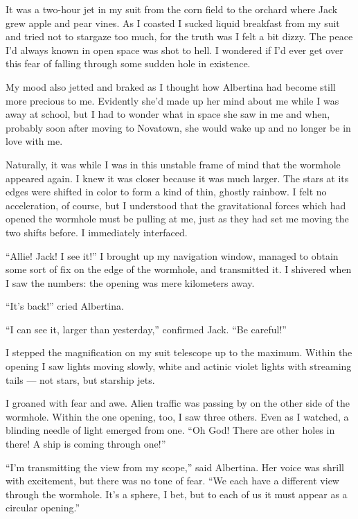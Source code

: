 \documentclass[english,11pt,letterpaper,onecolumn]{scrbook}
\begin{document}
	It was a two-hour jet in my suit from the corn field to the orchard where Jack grew apple and pear vines.  As I coasted I sucked liquid breakfast from my suit and tried not to stargaze too much, for the truth was I felt a bit dizzy.  The peace I'd always known in open space was shot to hell.  I wondered if I'd ever get over this fear of falling through some sudden hole in existence.  

	My mood also jetted and braked as I thought how Albertina had become still more precious to me.  Evidently she'd made up her mind about me while I was away at school, but I had to wonder what in space she saw in me and when, probably soon after moving to Novatown, she would wake up and no longer be in love with me.

	Naturally, it was while I was in this unstable frame of mind that the wormhole appeared again.  I knew it was closer because it was much larger.  The stars at its edges were shifted in color to form a kind of thin, ghostly rainbow.  I felt no acceleration, of course, but I understood that the gravitational forces which had opened the wormhole must be pulling at me, just as they had set me moving the two shifts before.  I immediately interfaced.

	``Allie!  Jack!  I see it!''  I brought up my navigation window, managed to obtain some sort of fix on the edge of the wormhole, and transmitted it.  I shivered when I saw the numbers:  the opening was mere kilometers away.

	``It's back!'' cried Albertina.

	``I can see it, larger than yesterday,'' confirmed Jack.  ``Be careful!''

	I stepped the magnification on my suit telescope up to the maximum.  Within the opening I saw lights moving slowly, white and actinic violet lights with streaming tails --- not stars, but starship jets.  

	I groaned with fear and awe.  Alien traffic was passing by on the other side of the wormhole.  Within the one opening, too, I saw three others.  Even as I watched, a blinding needle of light emerged from one.  ``Oh God!  There are other holes in there!  A ship is coming through one!''

	``I'm transmitting the view from my scope,'' said Albertina.  Her voice was shrill with excitement, but there was no tone of fear.  ``We each have a different view through the wormhole.  It's a sphere, I bet, but to each of us it must appear as a circular opening.''
\end{document}
